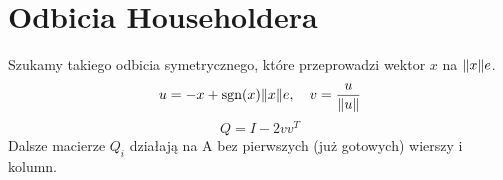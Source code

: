 \section{Odbicia Householdera}
Szukamy takiego odbicia symetrycznego, które przeprowadzi wektor \( x \) na \( \left\Vert x \right\Vert\!e \).
\[
	u = -x + \text{sgn}(x)\!\left\Vert x \right\Vert\!e,\quad v = \frac{u}{\left\Vert u \right\Vert}
\]
\[
	Q = I - 2vv^T
\]
Dalsze macierze \( Q_i \) działają na A bez pierwszych (już gotowych) wierszy i kolumn.